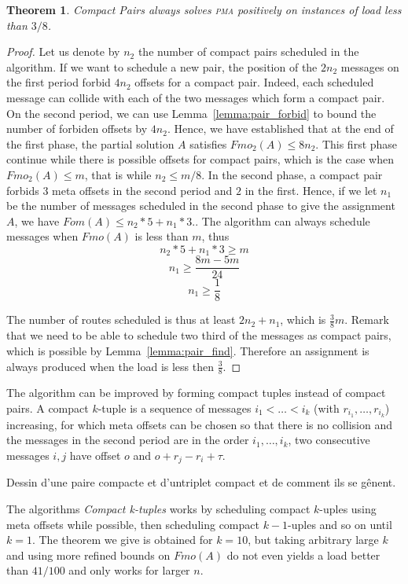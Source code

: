 \documentclass[10pt, conference, letterpaper]{IEEEtran}
\newtheorem{theorem}{Theorem}
\newcommand\pma{\textsc{pma}\xspace}
\begin{document}
\begin{theorem}
Compact Pairs always solves \pma positively on instances of load less than
$3/8$.
\end{theorem}
\begin{proof}
Let us denote by $n_2$ the number of compact pairs scheduled in the algorithm.
If we want to schedule a new pair, the position of the $2n_2$ messages on the first
period forbid $4n_2$ offsets for a compact pair. Indeed, each scheduled message can collide
with each of the two messages which form a compact pair. On the second period, we can use Lemma~\ref{lemma:pair_forbid} to bound the number of forbiden offsets by $4n_2$. 
Hence, we have established that at the end of the first phase, the partial solution $A$
satisfies $Fmo_2(A) \leq 8n_2$. This first phase continue while there is possible offsets for compact pairs, which is the case when $Fmo_2(A) \leq m$, that is while $n_2 \leq m/8$.
In the second phase, a compact pair forbids $3$ meta offsets in the 
second period and $2$ in the first. Hence, if we let $n_1$ be the number of messages scheduled in the second phase to give the assignment $A$, we have $Fom(A) \leq n_2*5 + n_1*3.$. 
The algorithm can always schedule messages when $Fmo(A)$ is less than $m$, thus
$$ n_2*5 + n_1*3 \geq m$$
$$ n_1 \geq \frac{8m - 5m }{24}$$
$$n_1 \geq \frac{1}{8}$$

The number of routes scheduled is thus at least $2n_2 + n_1$,
which is $\frac{3}{8}m$. Remark that we need to be able to schedule two third of the messages as compact pairs, which is possible by Lemma~\ref{lemma:pair_find}. Therefore an assignment is always produced when the load is less then $\frac{3}{8}$.
\end{proof}

The algorithm can be improved by forming compact tuples instead of compact pairs.
A compact $k$-tuple is a sequence of messages $i_1 < \dots < i_k$ (with $r_{i_1},\dots,r_{i_k}$)  increasing, for which meta offsets can be chosen so that there is no collision and
the messages in the second period are in the order $i_1,\dots,i_k$, two consecutive messages $i,j$ have offset $o$ and $o + r_j -r_i + \tau$.

Dessin d'une paire compacte et d'untriplet compact et de comment ils se gênent.

The algorithms \emph{Compact k-tuples} works by scheduling compact $k$-uples
using meta offsets while possible, then scheduling compact $k-1$-uples and so on until $k=1$.
The theorem we give is obtained for $k=10$, but taking arbitrary large $k$ and using more refined bounds on $Fmo(A)$ do not even yields a load better than $41/100$ and only works for larger $n$.
\end{document}
